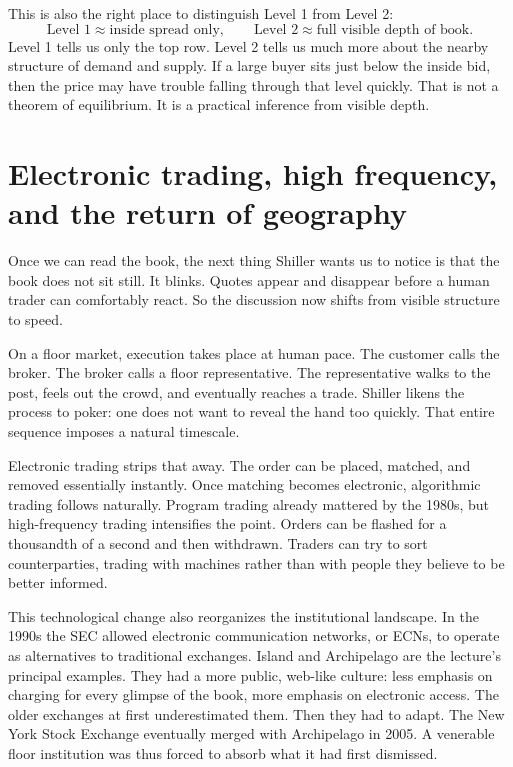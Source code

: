 This is also the right place to distinguish Level 1 from Level 2:
\begin{equation}
\text{Level 1} \approx \text{inside spread only},
\qquad
\text{Level 2} \approx \text{full visible depth of book}.
\end{equation}
Level 1 tells us only the top row. Level 2 tells us much more about the nearby structure of demand and supply. If a large buyer sits just below the inside bid, then the price may have trouble falling through that level quickly. That is not a theorem of equilibrium. It is a practical inference from visible depth.

\section{Electronic trading, high frequency, and the return of geography}

Once we can read the book, the next thing Shiller wants us to notice is that the book does not sit still. It blinks. Quotes appear and disappear before a human trader can comfortably react. So the discussion now shifts from visible structure to speed.

On a floor market, execution takes place at human pace. The customer calls the broker. The broker calls a floor representative. The representative walks to the post, feels out the crowd, and eventually reaches a trade. Shiller likens the process to poker: one does not want to reveal the hand too quickly. That entire sequence imposes a natural timescale.

Electronic trading strips that away. The order can be placed, matched, and removed essentially instantly. Once matching becomes electronic, algorithmic trading follows naturally. Program trading already mattered by the 1980s, but high-frequency trading intensifies the point. Orders can be flashed for a thousandth of a second and then withdrawn. Traders can try to sort counterparties, trading with machines rather than with people they believe to be better informed.

This technological change also reorganizes the institutional landscape. In the 1990s the SEC allowed electronic communication networks, or ECNs, to operate as alternatives to traditional exchanges. Island and Archipelago are the lecture's principal examples. They had a more public, web-like culture: less emphasis on charging for every glimpse of the book, more emphasis on electronic access. The older exchanges at first underestimated them. Then they had to adapt. The New York Stock Exchange eventually merged with Archipelago in 2005. A venerable floor institution was thus forced to absorb what it had first dismissed.

